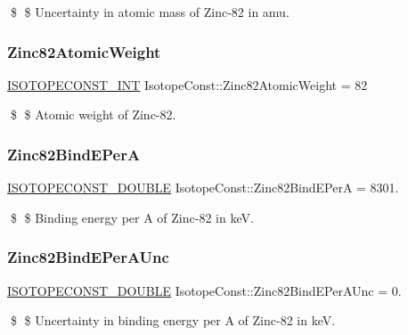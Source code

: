 \$ \$ Uncertainty in atomic mass of Zinc-\/82 in amu. \mbox{\label{group___isotope_const-_zinc-_zn82_ga145f2cbcef897ce7a30d3500f5a81e0c}} 
\subsubsection{\texorpdfstring{Zinc82\+Atomic\+Weight}{Zinc82AtomicWeight}}
{\footnotesize\ttfamily \mbox{\hyperlink{group___isotope_const-_macros_ga5f18360b3e99483a35c32d789e62621c}{I\+S\+O\+T\+O\+P\+E\+C\+O\+N\+S\+T\+\_\+\+I\+NT}} Isotope\+Const\+::\+Zinc82\+Atomic\+Weight = 82}

\$ \$ Atomic weight of Zinc-\/82. \mbox{\label{group___isotope_const-_zinc-_zn82_ga60a3300e5eebe80552d359a92a5bce96}} 
\subsubsection{\texorpdfstring{Zinc82\+Bind\+E\+PerA}{Zinc82BindEPerA}}
{\footnotesize\ttfamily \mbox{\hyperlink{group___isotope_const-_macros_ga8f45a7272ce02c0b4c65c44636ed719a}{I\+S\+O\+T\+O\+P\+E\+C\+O\+N\+S\+T\+\_\+\+D\+O\+U\+B\+LE}} Isotope\+Const\+::\+Zinc82\+Bind\+E\+PerA = 8301.}

\$ \$ Binding energy per A of Zinc-\/82 in keV. \mbox{\label{group___isotope_const-_zinc-_zn82_gae05362ce1658340ee7ccfeb030cebc82}} 
\subsubsection{\texorpdfstring{Zinc82\+Bind\+E\+Per\+A\+Unc}{Zinc82BindEPerAUnc}}
{\footnotesize\ttfamily \mbox{\hyperlink{group___isotope_const-_macros_ga8f45a7272ce02c0b4c65c44636ed719a}{I\+S\+O\+T\+O\+P\+E\+C\+O\+N\+S\+T\+\_\+\+D\+O\+U\+B\+LE}} Isotope\+Const\+::\+Zinc82\+Bind\+E\+Per\+A\+Unc = 0.}

\$ \$ Uncertainty in binding energy per A of Zinc-\/82 in keV. \mbox{\label{group___isotope_const-_zinc-_zn82_ga63efa3b919b54d1da184895319b45ee1}} 
